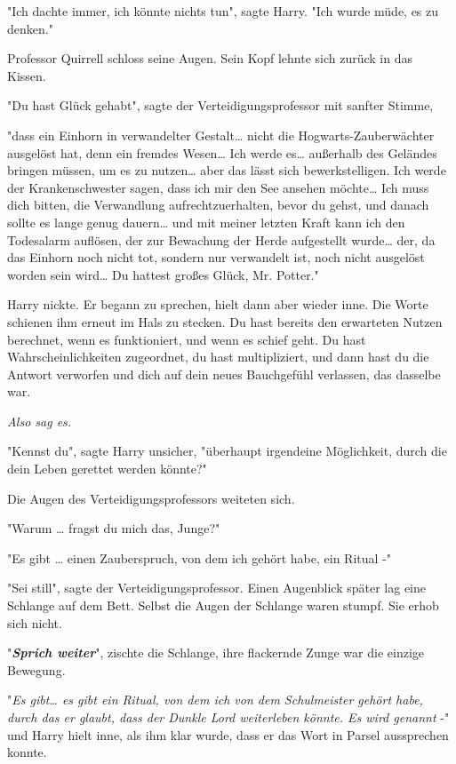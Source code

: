 {"Ich dachte immer, ich könnte nichts tun", sagte Harry. "Ich wurde müde, es zu denken."

Professor Quirrell schloss seine Augen. Sein Kopf lehnte sich zurück in das Kissen.

"Du hast Glück gehabt", sagte der Verteidigungsprofessor mit sanfter Stimme,

"dass ein Einhorn in verwandelter Gestalt… nicht die Hogwarts-Zauberwächter ausgelöst hat, denn ein fremdes Wesen… Ich werde es… außerhalb des Geländes bringen müssen, um es zu nutzen… aber das lässt sich bewerkstelligen. Ich werde der Krankenschwester sagen, dass ich mir den See ansehen möchte… Ich muss dich bitten, die Verwandlung aufrechtzuerhalten, bevor du gehst, und danach sollte es lange genug dauern… und mit meiner letzten Kraft kann ich den Todesalarm auflösen, der zur Bewachung der Herde aufgestellt wurde… der, da das Einhorn noch nicht tot, sondern nur verwandelt ist, noch nicht ausgelöst worden sein wird… Du hattest großes Glück, Mr. Potter."

Harry nickte. Er begann zu sprechen, hielt dann aber wieder inne. Die Worte schienen ihm erneut im Hals zu stecken. Du hast bereits den erwarteten Nutzen berechnet, wenn es funktioniert, und wenn es schief geht. Du hast Wahrscheinlichkeiten zugeordnet, du hast multipliziert, und dann hast du die Antwort verworfen und dich auf dein neues Bauchgefühl verlassen, das dasselbe war.

\emph{Also sag es.}

"Kennst du", sagte Harry unsicher, "überhaupt irgendeine Möglichkeit, durch die dein Leben gerettet werden könnte?"

Die Augen des Verteidigungsprofessors weiteten sich.

"Warum … fragst du mich das, Junge?"

"Es gibt … einen Zauberspruch, von dem ich gehört habe, ein Ritual -"

"Sei still", sagte der Verteidigungsprofessor. Einen Augenblick später lag eine Schlange auf dem Bett. Selbst die Augen der Schlange waren stumpf. Sie erhob sich nicht.

"\textbf{\emph{Sprich weiter}}", zischte die Schlange, ihre flackernde Zunge war die einzige Bewegung.

"\emph{Es gibt… es gibt ein Ritual, von dem ich von dem Schulmeister gehört habe, durch das er glaubt, dass der Dunkle Lord weiterleben könnte. Es wird genannt} -" und Harry hielt inne, als ihm klar wurde, dass er das Wort in Parsel aussprechen konnte.

}
